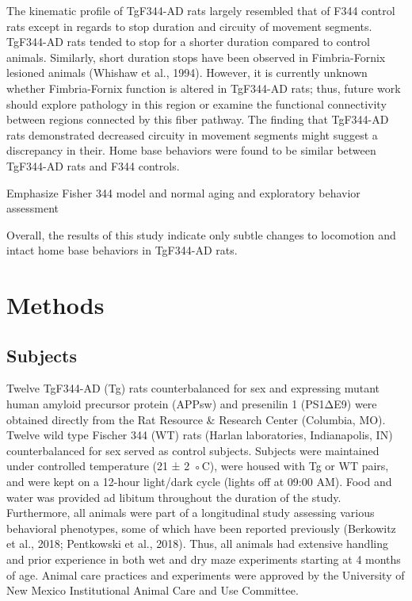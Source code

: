 \documentclass[fleqn,10pt]{wlscirep}
\begin{document}
The kinematic profile of TgF344-AD rats largely resembled that of F344 control rats except in regards to stop duration and circuity of movement segments. TgF344-AD rats tended to stop for a shorter duration compared to control animals. Similarly, short duration stops have been observed in Fimbria-Fornix lesioned animals (Whishaw et al., 1994). However, it is currently unknown whether Fimbria-Fornix function is altered in TgF344-AD rats; thus, future work should explore pathology in this region or examine the functional connectivity between regions connected by this fiber pathway. The finding that TgF344-AD rats demonstrated decreased circuity in movement segments might suggest a discrepancy in their.  
Home base behaviors were found to be similar between TgF344-AD rats and F344 controls.

Emphasize Fisher 344 model and normal aging and exploratory behavior assessment

Overall, the results of this study indicate only subtle changes to locomotion and intact home base behaviors in TgF344-AD rats.

\section*{Methods}

\subsection*{Subjects} 
	Twelve TgF344-AD (Tg) rats counterbalanced for sex and expressing mutant human amyloid precursor protein (APPsw) and presenilin 1 (PS1ΔE9) were obtained directly from the Rat Resource & Research Center (Columbia, MO). Twelve wild type Fischer 344 (WT) rats (Harlan laboratories, Indianapolis, IN) counterbalanced for sex served as control subjects. Subjects were maintained under controlled temperature (21 ± 2 ◦C), were housed with Tg or WT pairs, and were kept on a 12-hour light/dark cycle (lights off at 09:00 AM). Food and water was provided ad libitum throughout the duration of the study. Furthermore, all animals were part of a longitudinal study assessing various behavioral phenotypes, some of which have been reported previously (Berkowitz et al., 2018; Pentkowski et al., 2018). Thus, all animals had extensive handling and prior experience in both wet and dry maze experiments starting at 4 months of age. Animal care practices and experiments were approved by the University of New Mexico Institutional Animal Care and Use Committee.
\end{document}
